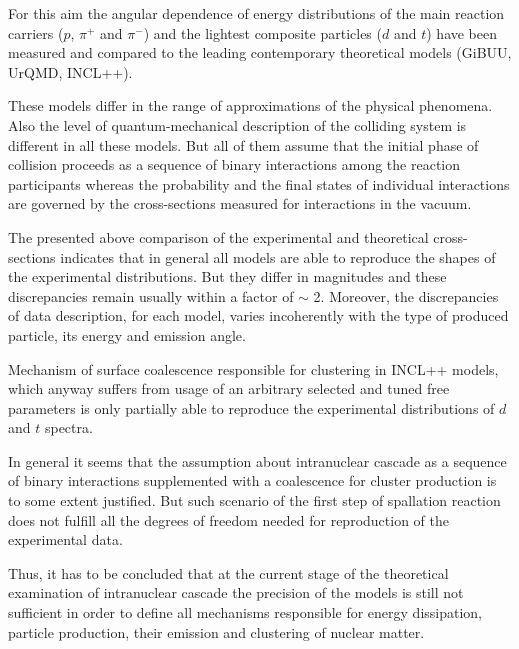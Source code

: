 For this aim the angular dependence of energy distributions of the main reaction carriers ($p$,  $\pi^{+}$ and $\pi^{-}$) and the lightest composite particles ($d$ and  $t$) have been measured and compared to the leading contemporary theoretical models (GiBUU, UrQMD, INCL++).

These models differ in the range of approximations of the physical phenomena. Also the level of  quantum-mechanical description of the colliding system is different in all these models. But all 
of them assume that the initial phase of collision proceeds as a sequence of binary interactions among the reaction participants whereas the probability and the final states of individual interactions are governed by the cross-sections measured for interactions in the vacuum.

The presented above comparison of the experimental and theoretical cross-sections indicates that in general all models are able to reproduce the shapes of the experimental distributions. But they differ in magnitudes and these discrepancies remain  usually within a factor of $\sim$ 2. 
Moreover, the discrepancies of data
description, for each model, varies incoherently with the type of produced particle, its energy and emission angle.

Mechanism of surface coalescence responsible for 
clustering in INCL++ models, which anyway suffers from usage of an arbitrary selected and tuned free parameters is only partially able to reproduce the 
experimental distributions of $d$ and $t$ spectra.

In general it seems that the assumption about intranuclear cascade as a sequence of binary interactions supplemented with a coalescence for cluster production is to some extent justified. 
But such scenario of the first step of spallation reaction does not fulfill all the degrees of freedom needed for reproduction of the experimental data. 

Thus, it has to be concluded that at the current stage of the theoretical examination of intranuclear cascade the precision of the models is still not sufficient in order to define all 
mechanisms responsible for energy dissipation, particle production, their emission  
and clustering of nuclear matter. 




